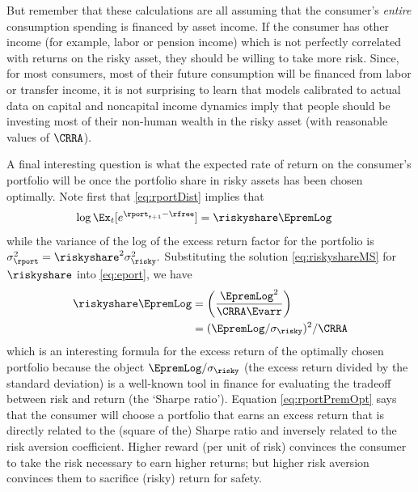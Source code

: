 But remember that these calculations are all assuming that the consumer's \textit{entire} consumption spending is financed by asset income.  If the consumer has other income (for example, labor or pension income) which is not perfectly correlated with returns on the risky asset, they should be willing to take more risk.  Since, for most consumers, most of their future consumption will be financed from labor or transfer income, it is not surprising to learn that models calibrated to actual data on capital and noncapital income dynamics imply that people should be investing most of their non-human wealth in the risky asset (with reasonable values of $\CRRA$).




A final interesting question is what the expected rate of return on
the consumer's portfolio will be once the portfolio share in risky
assets has been chosen optimally.  Note first that \eqref{eq:rportDist}
implies that
\begin{equation}\begin{gathered}\begin{aligned}
  \log \Ex_{t}[e^{\rport_{t+1}-\rfree}] & =  \riskyshare \EpremLog  \label{eq:eport}
\end{aligned}\end{gathered}\end{equation}
while the variance of the log of the excess return factor for the portfolio is $\sigma^{2}_{\rport} = \riskyshare^{2} \sigma^{2}_{\risky}.$  Substituting the solution \eqref{eq:riskyshareMS} for $\riskyshare$ into \eqref{eq:eport}, we have
\begin{equation}\begin{gathered}\begin{aligned}
  \riskyshare \EpremLog & =  \left(\frac{\EpremLog^{2}}{\CRRA \Evarr}\right)
\\ & =   (\EpremLog/\sigma_{\risky})^{2}/\CRRA \label{eq:rportPremOpt}
\end{aligned}\end{gathered}\end{equation}
which is an interesting formula for the excess return of the optimally
chosen portfolio because the object $\EpremLog/\sigma_{\risky}$ (the
excess return divided by the standard deviation) is a well-known tool
in finance for evaluating the tradeoff between risk and return (the
`Sharpe ratio').  Equation \eqref{eq:rportPremOpt} says that the consumer will
choose a portfolio that earns an excess return that is directly
related to the (square of the) Sharpe ratio and inversely related to the risk aversion
coefficient.  Higher reward (per unit of risk) convinces the consumer
to take the risk necessary to earn higher returns; but higher risk
aversion convinces them to sacrifice (risky) return for safety.


